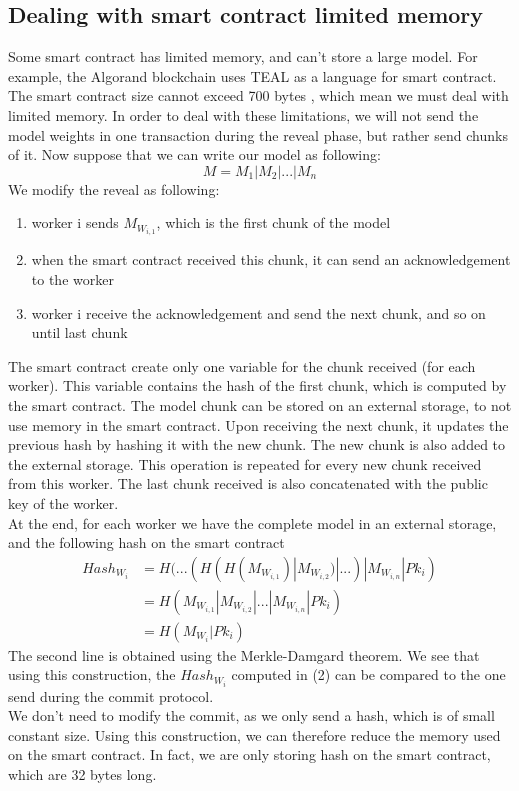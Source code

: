 \documentclass{article}
\begin{document}
\subsection{Dealing with smart contract limited memory}
Some smart contract has limited memory, and can't store a large model. For example, the Algorand blockchain uses TEAL
as a language for smart contract. The smart contract size cannot exceed 700 bytes \cite{TEAL_size}, which mean we must deal with limited
memory.
In order to deal with these limitations, we will not send the model weights in one transaction during the reveal phase,
but rather send chunks of it. Now suppose that we can write our model as following:
\begin{equation}
    M = M_1 | M_2 | ... | M_n
\end{equation}
We modify the reveal as following:
\begin{enumerate}
    \item worker i sends $M_{W_{i, 1}}$, which is the first chunk of the model
    \item when the smart contract received this chunk, it can send an acknowledgement to the worker
    \item worker i receive the acknowledgement and send the next chunk, and so on until last chunk
\end{enumerate}
The smart contract create only one variable for the chunk received (for each worker). This variable contains the hash
of the first chunk, which is computed by the smart contract. The model chunk can be stored on an external storage, to
not use memory in the smart contract. Upon receiving the next chunk,
it updates the previous hash by hashing it with the new chunk. The new chunk is also added to the external storage. This
operation is repeated for every new chunk received from this worker. The last chunk received is also concatenated with
the public key of the worker.\\
At the end, for each worker we have the complete model in an external storage, and the following hash on the smart contract
\begin{equation}
    \begin{split}
         Hash_{W_i} & = H(...(H(H(M_{W_{i, 1}})|M_{W_{i, 2}})|...)|M_{W_{i, n}}|Pk_i) \\
         & = H(M_{W_{i, 1}} | M_{W_{i, 2}} | ... | M_{W_{i, n}} | Pk_i) \\
         & = H (M_{W_i} | Pk_i)
        \end{split}
\end{equation}
The second line is obtained using the Merkle-Damgard theorem. We see that using this construction, the
$Hash_{W_i}$ computed in (2) can be compared to the one send during the commit protocol. \\
We don't need to modify the commit, as we only send a hash, which is of small constant size. Using this construction,
we can therefore reduce the memory used on the smart contract. In fact, we are only storing hash on the smart contract,
which are 32 bytes long.
\end{document}
